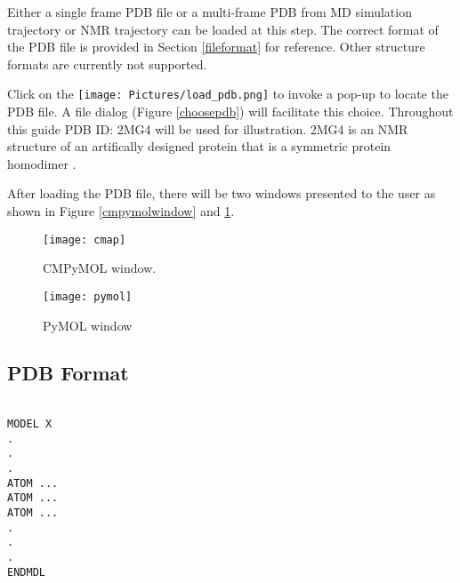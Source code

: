 \documentclass[11pt,fleqn]{book} %
\begin{document}
Either a single frame PDB file or a multi-frame PDB from MD simulation trajectory or NMR trajectory can be loaded at this step. The correct format of the PDB file is provided in Section \ref{fileformat} for reference. Other structure formats are currently not supported.

Click on the \texttt{[image: Pictures/load\_pdb.png]} to invoke a pop-up to locate the PDB file. A file dialog (Figure \ref{choosepdb}) will facilitate this choice. Throughout this guide PDB ID: 2MG4 will be used for illustration. 2MG4 is an NMR structure of an artifically designed protein that is a symmetric protein homodimer \cite{mou2015computational}.

After loading the PDB file, there will be two windows presented to the user as shown in Figure \ref{cmpymolwindow} and \ref{pymolwindow}.

\begin{figure}[ht!]
\centering
  \begin{minipage}[b]{0.45\textwidth}
  \centering
      \texttt{[image: cmap]}
      \caption{CMPyMOL window.}
  \label{cmpymolwindow}
  \end{minipage}
  \quad
  \begin{minipage}[b]{0.45\textwidth}
  \centering
      \texttt{[image: pymol]}
      \caption{PyMOL window}
  \label{pymolwindow}
  \end{minipage}
\end{figure}

\subsection{PDB Format}\label{fileformat}

\begin{lstlisting}

MODEL X
.
.
.
ATOM ...
ATOM ...
ATOM ...
.
.
.
ENDMDL

\end{lstlisting}



\end{document}
